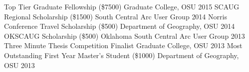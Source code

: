 \begin{cvhonors}
  \cvhonor
    {Top Tier Graduate Fellowship (\$7500)}%
    {} %
    {Graduate College, OSU} %
    {2015} %
  \cvhonor
    {SCAUG Regional Scholarship (\$1500)}%
    {} %
    {South Central Arc User Group} %
    {2014} %
  \cvhonor
    {Norris Conference Travel Scholarship (\$500)}%
    {} %
    {Department of Geography, OSU} %
    {2014} %
  \cvhonor
    {OKSCAUG Scholarship (\$500)}%
    {} %
    {Oklahoma South Central Arc User Group} %
    {2013} %
  \cvhonor
    {Three Minute Thesis Competition Finalist}%
    {} %
    {Graduate College, OSU} %
    {2013} %
  \cvhonor
    {Most Outstanding First Year Master's Student (\$1000)}%
    {} %
    {Department of Geography, OSU} %
    {2013} %
\end{cvhonors}
